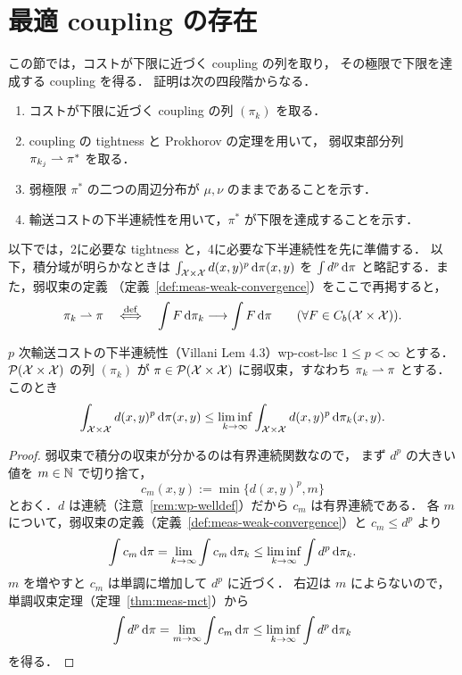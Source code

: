 \section{最適 coupling の存在}
\label{sec:wp-existence}

この節では，コストが下限に近づく coupling の列を取り，
その極限で下限を達成する coupling を得る．
証明は次の四段階からなる．
\begin{enumerate}
  \item コストが下限に近づく coupling の列 $(\pi_k)$ を取る．
  \item coupling の tightness と Prokhorov の定理を用いて，
    弱収束部分列 $\pi_{k_j}\rightharpoonup\pi^*$ を取る．
  \item 弱極限 $\pi^*$ の二つの周辺分布が $\mu,\nu$ のままであることを示す．
  \item 輸送コストの下半連続性を用いて，$\pi^*$ が下限を達成することを示す．
\end{enumerate}
以下では，2に必要な tightness と，4に必要な下半連続性を先に準備する．
以下，積分域が明らかなときは
$\int_{\mathcal{X}\times\mathcal{X}}d(x,y)^p\,\mathrm{d}\pi(x,y)$ を
$\int d^p\,\mathrm{d}\pi$ と略記する．また，弱収束の定義
（定義~\ref{def:meas-weak-convergence}）をここで再掲すると，
\[
  \pi_k\rightharpoonup\pi
  \quad\overset{\mathrm{def}}{\Longleftrightarrow}\quad
  \int F\,\mathrm{d}\pi_k\longrightarrow\int F\,\mathrm{d}\pi
  \qquad
  (\forall F\in C_b(\mathcal{X}\times\mathcal{X})).
\]

\begin{lemma}{$p$ 次輸送コストの下半連続性（Villani Lem 4.3）}{wp-cost-lsc}
  $1\leq p<\infty$ とする．
  $\mathcal{P}(\mathcal{X}\times\mathcal{X})$ の列 $(\pi_k)$ が
  $\pi\in\mathcal{P}(\mathcal{X}\times\mathcal{X})$ に弱収束，すなわち
  $\pi_k\rightharpoonup\pi$ とする．このとき
  \[
    \int_{\mathcal{X}\times\mathcal{X}}d(x,y)^p\,\mathrm{d}\pi(x,y)
    \leq
    \liminf_{k\to\infty}
    \int_{\mathcal{X}\times\mathcal{X}}d(x,y)^p\,\mathrm{d}\pi_k(x,y).
  \]
\end{lemma}

\begin{proof}
  弱収束で積分の収束が分かるのは有界連続関数なので，
  まず $d^p$ の大きい値を $m\in\mathbb{N}$ で切り捨て，
  \[
    c_m(x,y):=\min\{d(x,y)^p,m\}
  \]
  とおく．$d$ は連続（注意~\ref{rem:wp-welldef}）だから $c_m$ は有界連続である．
  各 $m$ について，弱収束の定義（定義~\ref{def:meas-weak-convergence}）と
  $c_m\leq d^p$ より
  \[
    \int c_m\,\mathrm{d}\pi
    =\lim_{k\to\infty}\int c_m\,\mathrm{d}\pi_k
    \leq\liminf_{k\to\infty}\int d^p\,\mathrm{d}\pi_k.
  \]
  $m$ を増やすと $c_m$ は単調に増加して $d^p$ に近づく．
  右辺は $m$ によらないので，単調収束定理（定理~\ref{thm:meas-mct}）から
  \[
    \int d^p\,\mathrm{d}\pi
    =\lim_{m\to\infty}\int c_m\,\mathrm{d}\pi
    \leq\liminf_{k\to\infty}\int d^p\,\mathrm{d}\pi_k
  \]
  を得る．
\end{proof}


